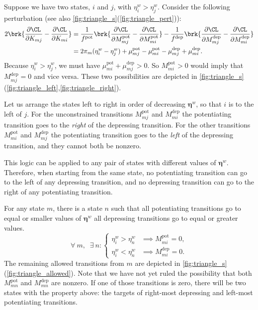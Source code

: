\documentclass[12pt]{article}
\newcommand{\eqm}{\pi}
\newcommand{\etwm}{\eta^w}
\newcommand{\etw}{\boldsymbol{\eta}^w}
\newcommand{\MMdm}{M}
\newcommand{\encm}{K}
\newcommand{\pot}{^{\text{pot}}}
\newcommand{\dep}{^{\text{dep}}}
\renewcommand{\pdiff}[2]{\frac{\partial #1}{\partial #2}}
\begin{document}
Suppose we have two states, \(i\) and \(j\), with \( \etwm_i > \etwm_j \).
Consider the following perturbation (see also \cref{fig:triangle_s}(\ref{fig:triangle_pert})):
%
\begin{equation}\label{eq:pertKupdn}
\begin{aligned}
  2 \brk{\pdiff{\CL}{\encm_{mj}} - \pdiff{\CL}{\encm_{mi}}}
  &= \frac{1}{f\pot} \brk{\pdiff{\CL}{\MMdm\pot_{mj}} - \pdiff{\CL}{\MMdm\pot_{mi}}} -
  \frac{1}{f\dep} \brk{\pdiff{\CL}{\MMdm\dep_{mj}} - \pdiff{\CL}{\MMdm\dep_{mi}}} \\ 
    &= 2 \eqm_m (\etwm_i - \etwm_j) 
    + \mu\pot_{mj} - \mu\pot_{mi} - \mu\dep_{mj} + \mu\dep_{mi}.
\end{aligned}
\end{equation}
%
Because \( \etwm_i > \etwm_j \), we must have \( \mu\pot_{mi} + \mu\dep_{mj} > 0 \).
So \( \MMdm\pot_{mi} > 0 \) would imply that \( \MMdm\dep_{mj} = 0 \) and vice versa.
These two possibilities are depicted in \cref{fig:triangle_s}(\ref{fig:triangle_left},\ref{fig:triangle_right}).

Let us arrange the states left to right in order of decreasing \(\etw\), so that \(i\) is to the left of \(j\).
For the unconstrained transitions \( \MMdm\pot_{mj} \) and \( \MMdm\dep_{mi} \) the potentiating transition goes to the \emph{right} of the depressing transition.
For the other transitions \( \MMdm\pot_{mi} \) and \( \MMdm\dep_{mj} \) the potentiating transition goes to the \emph{left} of the depressing transition, and they cannot both be nonzero.

This logic can be applied to any pair of states with different values of \(\etw\).
Therefore, when starting from the same state, no potentiating transition can go to the left of any depressing transition, and no depressing transition can go to the right of any potentiating transition.

For any state \(m\), there is a state \(n\) such that all potentiating transitions go to equal or smaller values of \(\etw\) all depressing transitions go to equal or greater values.
%
\begin{equation}\label{eq:separator}
  \forall\ m, \;\; \exists\ n : 
  \begin{cases}
    \etwm_i > \etwm_n &\implies \MMdm\pot_{mi} = 0, \\
    \etwm_i < \etwm_n &\implies \MMdm\dep_{mi} = 0.
  \end{cases}
\end{equation}
%
The remaining allowed transitions from \(m\) are depicted in \cref{fig:triangle_s}(\ref{fig:triangle_allowed}).
Note that we have not yet ruled the possibility that both \( \MMdm\pot_{mn} \) and \( \MMdm\dep_{mn} \) are nonzero.
If one of those transitions is zero, there will be two states with the property above: the targets of right-most depressing and left-most potentiating transitions.
\end{document}
